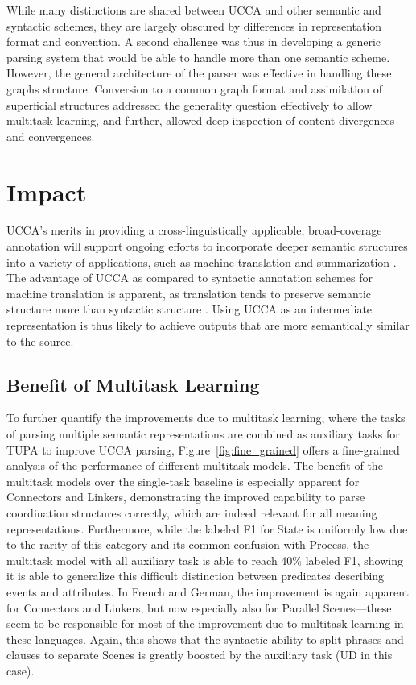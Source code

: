 \documentclass[12pt,a4paper,table]{report}
\begin{document}
While many distinctions are shared between UCCA and other semantic and syntactic schemes,
they are largely obscured by differences in representation format and convention.
A second challenge was thus in developing a generic parsing system that would be able
to handle more than one semantic scheme.
However, the general architecture of the parser was effective in handling these
graphs structure.
Conversion to a common graph format and assimilation of superficial structures
addressed the generality question effectively to allow multitask learning,
and further, allowed deep inspection of content divergences and convergences.

\section*{Impact}

UCCA's merits in providing a cross-linguistically applicable,
broad-coverage annotation will support ongoing efforts to incorporate deeper
semantic structures into a variety of applications, such as machine translation
\citep{jones2012semantics} and summarization \citep{liu2015toward}.
The advantage of UCCA as compared to syntactic annotation schemes for machine translation is apparent,
as translation tends to preserve semantic structure more than syntactic structure \citep{sulem2015conceptual}.
Using UCCA as an intermediate representation is thus likely to achieve outputs that are more
semantically similar to the source.

\subsection*{Benefit of Multitask Learning}

To further quantify the improvements due to multitask learning, where the tasks of parsing
multiple semantic representations are combined as auxiliary tasks for TUPA to improve UCCA
parsing, Figure~\ref{fig:fine_grained} offers a fine-grained analysis of the performance of different
multitask models.
The benefit of the multitask models over the single-task baseline is especially apparent for
Connectors and Linkers, demonstrating the improved capability to parse coordination structures
correctly, which are indeed relevant for all meaning representations.
Furthermore, while the labeled F1 for State is uniformly low due to the rarity of this category
and its common confusion with Process, the multitask model with all auxiliary task is able to reach
40\% labeled F1, showing it is able to generalize this difficult distinction between predicates
describing events and attributes.
In French and German, the improvement is again apparent for Connectors and Linkers,
but now especially also for Parallel Scenes---these seem to be responsible for most of the improvement
due to multitask learning in these languages.
Again, this shows that the syntactic ability to split phrases and clauses to separate Scenes is greatly
boosted by the auxiliary task (UD in this case).
\end{document}
